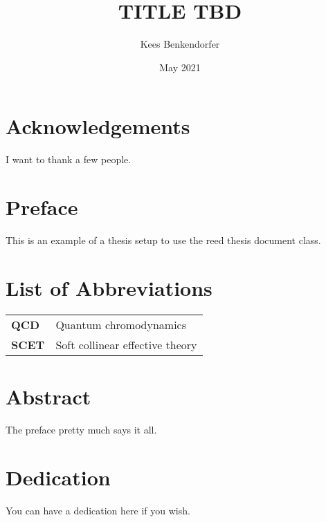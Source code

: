 \documentclass[12pt,twoside]{reedthesis}
\title{TITLE TBD}
\author{Kees Benkendorfer}
\date{May 2021}
\begin{document}
  \maketitle
  \frontmatter %
  \pagestyle{empty} %

    \chapter*{Acknowledgements}
	I want to thank a few people.

    \chapter*{Preface}
	This is an example of a thesis setup to use the reed thesis document class.
	
	

    \chapter*{List of Abbreviations}

	\begin{table}[h]
	\centering %
	\begin{tabular}{ll}
		\textbf{QCD}  	&  Quantum chromodynamics \\
		\textbf{SCET}  	&  Soft collinear effective theory\\
	\end{tabular}
	\end{table}
	

    \tableofcontents
    \listoftables
    \listoffigures

    \chapter*{Abstract}
	The preface pretty much says it all.
	
	\chapter*{Dedication}
	You can have a dedication here if you wish.
\end{document}
